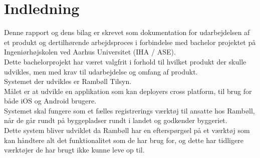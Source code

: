 \chapter{Indledning}
Denne rapport og dens bilag er skrevet som dokumentation for udarbejdelsen af et produkt
og dertilhørende arbejdsproces i forbindelse med bachelor projektet på Ingeniørhøjskolen
ved Aarhus Universitet (IHA / ASE).\\
Dette bachelorprojekt har været valgfrit i forhold til hvilket produkt der skulle udvikles, men med
krav til udarbejdelse og omfang af produkt.\\
Systemet der udvikles er Rambøll Tilsyn.\\
\newline
Målet er at udvikle en applikation som kan deployers cross platform, til brug for både iOS og Android brugere. \\
Systemet skal fungere som et fælles registrerings værktøj til ansatte hos Rambøll, når de går rundt på byggepladser rundt i landet og godkender byggeriet. \\
Dette system bliver udviklet da Rambøll har en efterspørgsel på et værktøj som kan håndtere alt det funktionalitet som de har brug for, og dette har tidligere værktøjer de har brugt ikke kunne leve op til. \\

